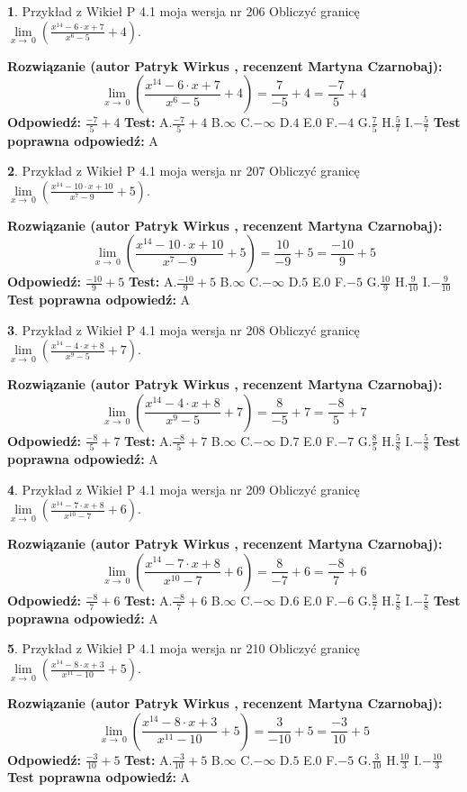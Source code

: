 \documentclass[12pt, a4paper]{article}
\theoremstyle{definition} %
\newtheorem{zad}{}
\newcommand{\zadStart}[1]{\begin{zad}#1\newline}
\newcommand{\zadStop}{\end{zad}}
\newcommand{\rozwStart}[2]{\noindent \textbf{Rozwiązanie (autor #1 , recenzent #2): }\newline}
\newcommand{\rozwStop}{\newline}
\newcommand{\odpStart}{\noindent \textbf{Odpowiedź:}\newline}
\newcommand{\odpStop}{\newline}
\newcommand{\testStart}{\noindent \textbf{Test:}\newline}
\newcommand{\testStop}{\newline}
\newcommand{\kluczStart}{\noindent \textbf{Test poprawna odpowiedź:}\newline}
\newcommand{\kluczStop}{\newline}
\begin{document}
\zadStart{Przykład z Wikieł P 4.1 moja wersja nr 206}
Obliczyć granicę $\lim\limits_{x\to\ 0}(\frac{x^{14}-6 \cdot x +7}{x^{6}-5}+4)$.
\zadStop
\rozwStart{Patryk Wirkus}{Martyna Czarnobaj}
$$\lim\limits_{x\to\ 0}(\frac{x^{14}-6 \cdot x +7}{x^{6}-5}+4)=\frac{7}{-5}+4=\frac{-7}{5}+4$$
\rozwStop
\odpStart
$\frac{-7}{5}+4$
\odpStop
\testStart
A.$\frac{-7}{5}+4$
B.$\infty$
C.$-\infty$
D.$4$
E.$0$
F.$-4$
G.$\frac{7}{5}$
H.$\frac{5}{7}$
I.$-\frac{5}{7}$
\testStop
\kluczStart
A
\kluczStop



\zadStart{Przykład z Wikieł P 4.1 moja wersja nr 207}
Obliczyć granicę $\lim\limits_{x\to\ 0}(\frac{x^{14}-10 \cdot x +10}{x^{7}-9}+5)$.
\zadStop
\rozwStart{Patryk Wirkus}{Martyna Czarnobaj}
$$\lim\limits_{x\to\ 0}(\frac{x^{14}-10 \cdot x +10}{x^{7}-9}+5)=\frac{10}{-9}+5=\frac{-10}{9}+5$$
\rozwStop
\odpStart
$\frac{-10}{9}+5$
\odpStop
\testStart
A.$\frac{-10}{9}+5$
B.$\infty$
C.$-\infty$
D.$5$
E.$0$
F.$-5$
G.$\frac{10}{9}$
H.$\frac{9}{10}$
I.$-\frac{9}{10}$
\testStop
\kluczStart
A
\kluczStop



\zadStart{Przykład z Wikieł P 4.1 moja wersja nr 208}
Obliczyć granicę $\lim\limits_{x\to\ 0}(\frac{x^{14}-4 \cdot x +8}{x^{9}-5}+7)$.
\zadStop
\rozwStart{Patryk Wirkus}{Martyna Czarnobaj}
$$\lim\limits_{x\to\ 0}(\frac{x^{14}-4 \cdot x +8}{x^{9}-5}+7)=\frac{8}{-5}+7=\frac{-8}{5}+7$$
\rozwStop
\odpStart
$\frac{-8}{5}+7$
\odpStop
\testStart
A.$\frac{-8}{5}+7$
B.$\infty$
C.$-\infty$
D.$7$
E.$0$
F.$-7$
G.$\frac{8}{5}$
H.$\frac{5}{8}$
I.$-\frac{5}{8}$
\testStop
\kluczStart
A
\kluczStop



\zadStart{Przykład z Wikieł P 4.1 moja wersja nr 209}
Obliczyć granicę $\lim\limits_{x\to\ 0}(\frac{x^{14}-7 \cdot x +8}{x^{10}-7}+6)$.
\zadStop
\rozwStart{Patryk Wirkus}{Martyna Czarnobaj}
$$\lim\limits_{x\to\ 0}(\frac{x^{14}-7 \cdot x +8}{x^{10}-7}+6)=\frac{8}{-7}+6=\frac{-8}{7}+6$$
\rozwStop
\odpStart
$\frac{-8}{7}+6$
\odpStop
\testStart
A.$\frac{-8}{7}+6$
B.$\infty$
C.$-\infty$
D.$6$
E.$0$
F.$-6$
G.$\frac{8}{7}$
H.$\frac{7}{8}$
I.$-\frac{7}{8}$
\testStop
\kluczStart
A
\kluczStop



\zadStart{Przykład z Wikieł P 4.1 moja wersja nr 210}
Obliczyć granicę $\lim\limits_{x\to\ 0}(\frac{x^{14}-8 \cdot x +3}{x^{11}-10}+5)$.
\zadStop
\rozwStart{Patryk Wirkus}{Martyna Czarnobaj}
$$\lim\limits_{x\to\ 0}(\frac{x^{14}-8 \cdot x +3}{x^{11}-10}+5)=\frac{3}{-10}+5=\frac{-3}{10}+5$$
\rozwStop
\odpStart
$\frac{-3}{10}+5$
\odpStop
\testStart
A.$\frac{-3}{10}+5$
B.$\infty$
C.$-\infty$
D.$5$
E.$0$
F.$-5$
G.$\frac{3}{10}$
H.$\frac{10}{3}$
I.$-\frac{10}{3}$
\testStop
\kluczStart
A
\kluczStop
\end{document}

